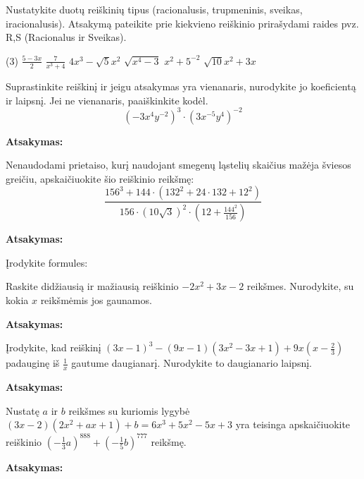 \documentclass[12pt]{exam}
\newcommand{\atsakymas}{%
    \par\vspace{0.3cm}
    \textbf{Atsakymas:} \framebox[7cm]{\rule{0pt}{0.7cm}}
}
\begin{document}
\begin{questions}

\question[3] Nustatykite duotų reiškinių tipus (racionalusis, trupmeninis, sveikas, iracionalusis). Atsakymą pateikite prie kiekvieno reiškinio prirašydami raides pvz. R,S (Racionalus ir Sveikas).
\begin{tasks}[label-width=1.2em](3)
    \task $\displaystyle \frac{5-3x}{2}$
    \task $\displaystyle \frac{7}{x^3 + 4}$
    \task $\displaystyle 4x^3 - \sqrt{5} x^2$
    \task $\displaystyle \sqrt{x^4 - 3}$
    \task $\displaystyle x^2 + 5^{-2}$
    \task $\displaystyle \sqrt{10}x^2 + 3x$
\end{tasks}
\droppoints

\question[4] Suprastinkite reiškinį ir jeigu atsakymas yra vienanaris, nurodykite jo koeficientą ir laipsnį. Jei ne vienanaris, paaiškinkite kodėl.
$$ \left( -3x^4y^{-2} \right)^3 \cdot \left( 3x^{-5}y^4 \right)^{-2} $$
\droppoints
\vspace{2.5cm}
\atsakymas

\question[4] Nenaudodami prietaiso, kurį naudojant smegenų ląstelių skaičius mažėja šviesos greičiu, apskaičiuokite šio reiškinio reikšmę:
\[ \frac{156^3+144 \cdot\left(132^2+24 \cdot 132+12^2\right)}{156 \cdot(10 \sqrt{3})^2 \cdot\left(12+\frac{144^2}{156}\right)} \] \vspace{3.5cm}
\atsakymas

\question Įrodykite formules:
\newpage

\question[4] Raskite didžiausią ir mažiausią reiškinio $-2x^2 + 3x - 2$ reikšmes. Nurodykite, su kokia $x$ reikšmėmis jos gaunamos.
\droppoints
\vspace{3.5cm}
\atsakymas

\question[5]  Įrodykite, kad reiškinį $(3x-1)^3 - (9x-1)(3x^2 - 3x + 1) + 9x\left(x - \frac{2}{3}\right)$ padauginę iš $\frac{1}{x} $ gautume daugianarį. Nurodykite to daugianario laipsnį. 
\droppoints
\vspace{3.5cm}
\atsakymas

\question[4] Nustatę $a$ ir $b$ reikšmes su kuriomis lygybė $(3x-2)\left(2x^2+ax+1\right)+b = 6x^3+5x^2-5x+3$ yra teisinga apskaičiuokite reiškinio $\left(-\frac{1}{3}a\right)^{888} + \left(-\frac{1}{5}b\right)^{777}$ reikšmę. 
\droppoints
\vspace{8cm}
\atsakymas
\end{questions}
\end{document}
